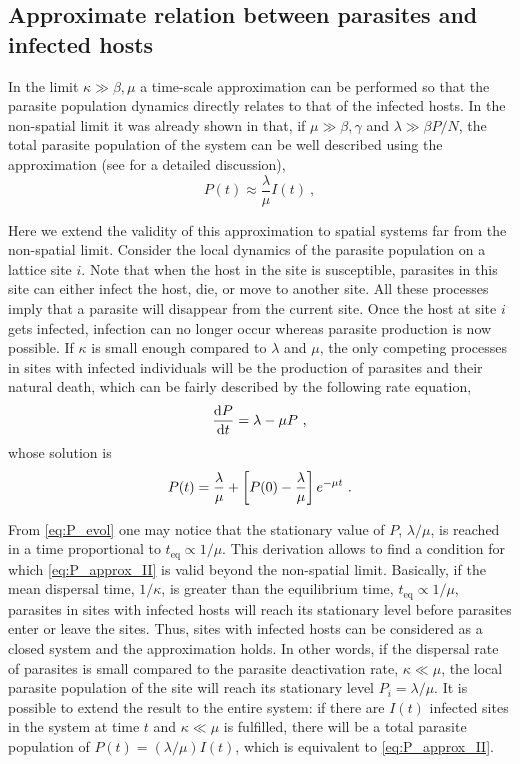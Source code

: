 \subsection{Approximate relation between parasites and infected hosts}

In the limit $\kappa\gg\beta,\mu$ a time-scale approximation can be
performed so that the parasite population dynamics directly relates to that of
the infected hosts. In the non-spatial limit it was already shown in
\cite{GimenezRomero2021} that, if  $\mu\gg\beta,\gamma$ and $\lambda\gg\beta
    P/N$, the total parasite population of the system can be well described
using
the approximation (see \cite{GimenezRomero2021} for a detailed discussion),
\begin{equation}\label{eq:P_approx_II_II}
    P(t)\approx \frac{\lambda}{\mu} I(t) \ ,
\end{equation}

Here we extend the validity of this approximation to spatial systems far
from the non-spatial limit. Consider the local dynamics of the parasite
population on a lattice site $i$. Note that when the host in the site is
susceptible, parasites in this site can either infect the host, die, or move to
another site. All these processes imply that a parasite will disappear from the
current site. Once the host at site $i$ gets infected, infection can no longer
occur whereas parasite production is now possible. If $\kappa$ is small enough
compared to $\lambda$ and $\mu$,  the only competing processes in sites with
infected individuals will be the production of parasites and their natural
death, which can be fairly described by the following rate equation,
\begin{equation}
    \frac{\mathrm{d} P}{\mathrm{d} t}=\lambda-\mu P \ ,
\end{equation}
whose solution is
\begin{equation}\label{eq:P_evol}
    P(t)=\frac{\lambda}{\mu}+\left[P(0)-\frac{\lambda}{\mu}\right]e^{-\mu t}
    \ .
\end{equation}

From \cref{eq:P_evol} one may notice that the stationary value of $P$,
$\lambda/\mu$, is reached in a time proportional to $t_{\textrm{eq}}\propto
    1/\mu$. This derivation allows to find a condition for which
\cref{eq:P_approx_II}
is valid beyond the non-spatial limit. Basically, if the mean dispersal time,
$1/\kappa$, is greater than the equilibrium time, $t_{\textrm{eq}}\propto
    1/\mu$, parasites in sites with infected hosts will reach its stationary
level
before parasites enter or leave the sites. Thus, sites with infected hosts can
be considered as a closed system and the approximation holds. In other words,
if the dispersal rate of parasites is small compared to the parasite
deactivation rate, $\kappa \ll \mu$, the local parasite population of the site
will reach its stationary level $P_i=\lambda/\mu$. It is possible to extend the
result to the entire system: if there are $I(t)$ infected sites in the system
at time $t$ and $\kappa\ll\mu$ is fulfilled, there will be a total parasite
population of $P(t)=(\lambda/\mu) I(t)$, which is equivalent to
\cref{eq:P_approx_II}.

